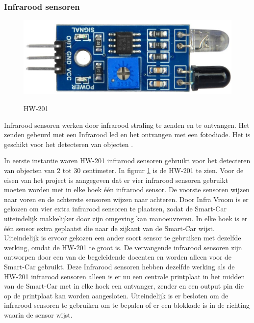 \subsubsection{Infrarood sensoren} \label{Hoofdstuk-IR-onderdelen}
\begin{figure}[h]
    \centering
    \includegraphics[scale = 0.35]{Media/Figuren/HW-201.jpg}
    \caption{HW-201}
    \label{HW-201}
    \cite{HW-201-hardware} 
\end{figure}
Infrarood sensoren werken door infrarood straling te zenden en te ontvangen. Het zenden gebeurd met een Infrarood led en het ontvangen met een fotodiode. Het is geschikt voor het detecteren van objecten \cite{IR-datasheet}.

In eerste instantie waren HW-201 infrarood sensoren gebruikt voor het detecteren van objecten van 2 tot 30 centimeter. In figuur \ref{HW-201}\cite{HW-201-hardware} is de HW-201 te zien. Voor de eisen van het project is aangegeven dat er vier infrarood sensoren gebruikt moeten worden met in elke hoek één infrarood sensor. De voorste sensoren wijzen naar voren en de achterste sensoren wijzen naar achteren. Door Infra Vroom is er gekozen om vier extra infrarood sensoren te plaatsen, zodat de \gls{Smart-Car} uiteindelijk makkelijker door zijn omgeving kan manoeuvreren. In elke hoek is er één sensor extra geplaatst die naar de zijkant van de \gls{Smart-Car} wijst. Uiteindelijk is ervoor gekozen een ander soort sensor te gebruiken met dezelfde werking, omdat de HW-201 te groot is. De vervangende infrarood sensoren zijn ontworpen door een van de begeleidende docenten en worden alleen voor de \gls{Smart-Car} gebruikt. Deze Infrarood sensoren hebben dezelfde werking als de HW-201 infrarood sensoren alleen is er nu een centrale printplaat in het midden van de \gls{Smart-Car} met in elke hoek een ontvanger, zender en een output pin die op de printplaat kan worden aangesloten. Uiteindelijk is er besloten om de infrarood sensoren te gebruiken om te bepalen of er een blokkade is in de richting waarin de sensor wijst.
